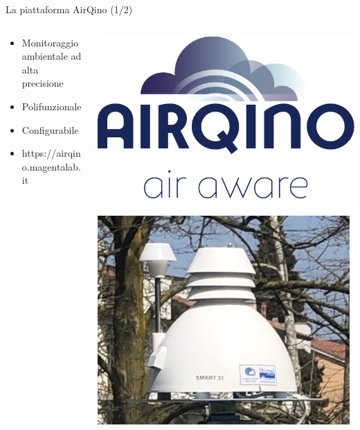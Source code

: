 \begin{frame}{La piattaforma AirQino (1/2)}
\begin{columns}[T]
\begin{column}{0.6\textwidth}

\begin{itemize}
  \item Monitoraggio ambientale ad alta precisione
  \item Polifunzionale
  \item Configurabile
  \item \alert{https://airqino.magentalab.it}
\end{itemize}

\end{column}

\begin{column}{0.4\textwidth}
\begin{center}
\includegraphics[width=.6\textwidth]{images/airqino}\vspace{0.3cm}
\includegraphics[width=.8\textwidth]{images/airqino_stazione}
\end{center}
\end{column}

\end{columns}
\end{frame}

